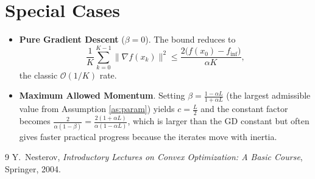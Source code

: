 \documentclass{article}
\begin{document}
\section*{Special Cases}
\begin{itemize}
\item \textbf{Pure Gradient Descent} ($\beta=0$).  The bound reduces to
\[
\frac{1}{K}\sum_{k=0}^{K-1}\|\nabla f(x_k)\|^{2}\le\frac{2\bigl(f(x_0)-f_{\inf}\bigr)}{\alpha K},
\]
the classic $\mathcal{O}(1/K)$ rate.
\item \textbf{Maximum Allowed Momentum}.  Setting $\beta=\frac{1-\alpha L}{1+\alpha L}$ (the largest admissible value from Assumption \ref{as:param}) yields $c=\frac{L}{2}$ and the constant factor becomes $\frac{2}{\alpha(1-\beta)}=\frac{2(1+\alpha L)}{\alpha(1-\alpha L)}$, which is larger than the GD constant but often gives faster practical progress because the iterates move with inertia.
\end{itemize}

\begin{thebibliography}{9}
Y.~Nesterov,
\textit{Introductory Lectures on Convex Optimization: A Basic Course},
Springer, 2004.
\end{thebibliography}
\end{document}
